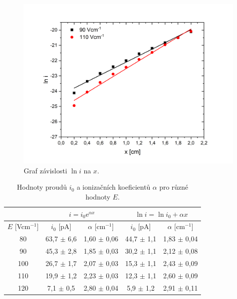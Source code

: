 \documentclass[a4paper,12pt]{article}
\newcommand{\e}{\text{e}}
\begin{document}
\begin{figure}[h!]
	\centering
	\includegraphics[width=145mm]{lni90-110.png}
	\caption{Graf závislosti $\ln i$ na $x$.}
	\label{lni90-110}
\end{figure}

\begin{center}
	\begin{table}[h]
		\centering
		\caption{Hodnoty proudů $i_0$ a ionizačních koeficientů $\alpha$ pro různé hodnoty $E$.}
		\label{tab1}
		\begin{tabular}{|c|c|c|c|c|} \hline
			\multicolumn{1}{|c|}{}  & \multicolumn{2}{c|}{$i = i_0 \e^{\alpha 
					x}$}& \multicolumn{2}{c|}{$\ln i = \ln i_0 + \alpha x$}  \\ \hline
			$E$ [Vcm$^{-1}$] & $i_0$ [pA] & $\alpha$ [cm$^{-1}$] & $i_0$ [pA] & $\alpha$ [cm$^{-1}$] \\ \hline
			80 & 63,7 $\pm$ 6,6 & 1,60 $\pm$ 0,06 & 44,7 $\pm$ 1,1 & 1,83 $\pm$ 
			0,04\\ \hline
			90 & 45,3 $\pm$ 2,8 & 1,85 $\pm$ 0,03& 30,2 $\pm$ 1,1 & 2,12 $\pm$ 
			0,08\\ \hline
			100 & 26,7 $\pm$ 1,7 & 2,07 $\pm$ 0,03 & 15,3 $\pm$ 1,1 & 2,43 
			$\pm$ 0,09\\ \hline
			110 & 19,9 $\pm$ 1,2 & 2,23 $\pm$ 0,03 & 12,3 $\pm$ 1,1 & 2,60 
			$\pm$ 0,09 \\ \hline
			120 & 7,1 $\pm$ 0,5 & 2,80 $\pm$ 0,04 & 5,9 $\pm$ 1,2 & 2,91 
			$\pm$ 0,11 \\ \hline
			
		\end{tabular}
	\end{table}
\end{center}
\end{document}

